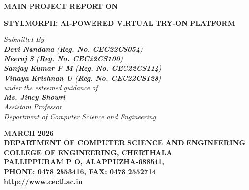 \documentclass[12pt,a4paper,oneside]{report}
\begin{document}
\thispagestyle{fancy}
\pagestyle{fancy}

\begin{titlepage}
\begin{center}
\Large{\textbf{MAIN PROJECT REPORT ON}}

\begin{singlespace}
\LARGE{\textbf{STYLMORPH: AI-POWERED VIRTUAL TRY-ON PLATFORM}}\\
\end{singlespace}
\Large{\textit{Submitted By }}\\
\large{\textit{\textbf{Devi Nandana}
(\textbf{Reg. No. CEC22CS054})}}\\
\large{\textit{\textbf{Neeraj S}
(\textbf{Reg. No. CEC22CS100})}}\\
\large{\textit{\textbf{Sanjay Kumar P M}
(\textbf{Reg. No. CEC22CS114})}}\\
\large{\textit{\textbf{Vinaya Krishnan U}
(\textbf{Reg. No. CEC22CS128})}}\\

\large{\textit{under the esteemed guidance of}}\\
\large{\textit{\textbf{Ms. Jincy Showri} }}\\
\large{\textit{Assistant Professor}}\\
\large{\textit{Department of Computer Science and Engineering}}
\\
\begin{figure}[h]
\begin{center}
\end{center}
\end{figure}
\begin{singlespace}
\large{\textbf{MARCH 2026}}\\

\large{\textbf{DEPARTMENT OF COMPUTER SCIENCE AND ENGINEERING\\COLLEGE OF ENGINEERING, CHERTHALA\\ PALLIPPURAM P O, ALAPPUZHA-688541, \\PHONE: 0478 2553416, FAX: 0478 2552714\\http://www.cectl.ac.in}}
\end{singlespace}
\end{center}
\end{titlepage}
\end{document}

